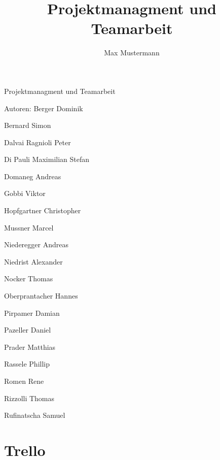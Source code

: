 \documentclass{article}
\title{Projektmanagment und Teamarbeit}
\author{Max Mustermann}
\begin{document}
\begin{center}



Projektmanagment und Teamarbeit

Autoren: Berger Dominik

Bernard Simon

Dalvai Ragnioli Peter

Di Pauli Maximilian Stefan

Domaneg Andreas

Gobbi Viktor

Hopfgartner Christopher

Mussner Marcel

Niederegger Andreas

Niedrist Alexander

Nocker Thomas

Oberprantacher Hannes

Pirpamer Damian

Pazeller Daniel

Prader Matthias

Rassele Phillip

Romen Rene

Rizzolli Thomas

Rufinatscha Samuel
\end{center}
\newpage
\tableofcontents


\section{Trello}



















\end{document}
